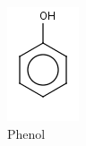 \begin{figure}[H]
\begin{subfigure}[b]{.14\textwidth}
\includegraphics[width=\textwidth]{figures_c3/PHENOL.png}
\caption{Phenol}
\end{subfigure}
\begin{subfigure}[b]{.19\textwidth}

\end{subfigure}
\end{figure}
